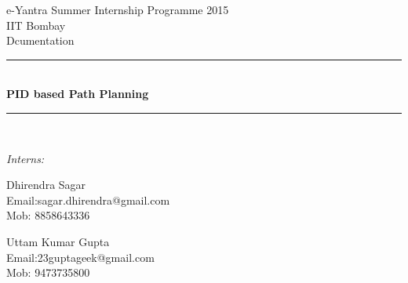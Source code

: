 \documentclass[report]{res}
\begin{document}
	
	\begin{titlepage}
		
		\newcommand{\HRule}{\rule{\linewidth}{0.5mm}} %
		
		\center %
		
		{\LARGE e-Yantra Summer Internship Programme 2015}\\[1.5cm] 
		{\Large IIT Bombay}\\[1cm] %
		{\large Dcumentation}\\
		
		
		
		\HRule \\[0.4cm]
		{ \huge \bfseries PID based Path Planning }\\[0.4cm] %
		\HRule \\[4cm]
		
		
		\begin{minipage}{0.4\textwidth}
			\begin{flushleft} \large
				\emph{Interns: }\\
			\end{flushleft}
			
			\begin{flushleft}
				{\large Dhirendra Sagar} \\  Email:sagar.dhirendra@gmail.com \\ Mob: 8858643336
			\end{flushleft}
			
			\begin{flushleft}
				{\large Uttam Kumar Gupta} \\  Email:23guptageek@gmail.com	\\Mob: 9473735800 \\
			\end{flushleft}
			

\end{minipage}
\end{titlepage}
\end{document}
